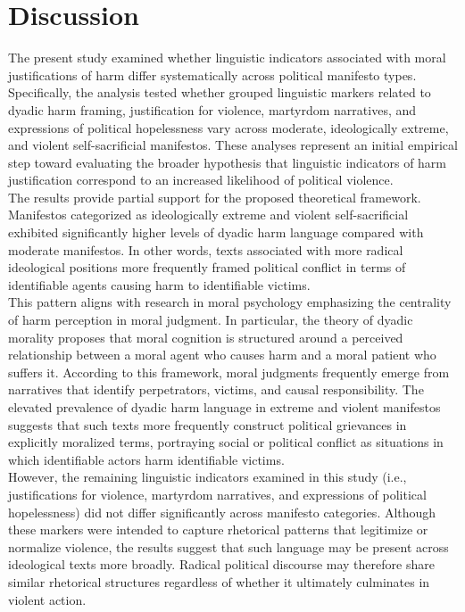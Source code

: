 \documentclass[
  english,
  man,floatsintext]{apa6}
\begin{document}
\section{Discussion}\label{discussion}

The present study examined whether linguistic indicators associated with moral justifications of harm differ systematically across political manifesto types. Specifically, the analysis tested whether grouped linguistic markers related to dyadic harm framing, justification for violence, martyrdom narratives, and expressions of political hopelessness vary across moderate, ideologically extreme, and violent self-sacrificial manifestos. These analyses represent an initial empirical step toward evaluating the broader hypothesis that linguistic indicators of harm justification correspond to an increased likelihood of political violence.\\
The results provide partial support for the proposed theoretical framework. Manifestos categorized as ideologically extreme and violent self-sacrificial exhibited significantly higher levels of dyadic harm language compared with moderate manifestos. In other words, texts associated with more radical ideological positions more frequently framed political conflict in terms of identifiable agents causing harm to identifiable victims.\\
This pattern aligns with research in moral psychology emphasizing the centrality of harm perception in moral judgment. In particular, the theory of dyadic morality proposes that moral cognition is structured around a perceived relationship between a moral agent who causes harm and a moral patient who suffers it. According to this framework, moral judgments frequently emerge from narratives that identify perpetrators, victims, and causal responsibility. The elevated prevalence of dyadic harm language in extreme and violent manifestos suggests that such texts more frequently construct political grievances in explicitly moralized terms, portraying social or political conflict as situations in which identifiable actors harm identifiable victims.\\
However, the remaining linguistic indicators examined in this study (i.e., justifications for violence, martyrdom narratives, and expressions of political hopelessness) did not differ significantly across manifesto categories. Although these markers were intended to capture rhetorical patterns that legitimize or normalize violence, the results suggest that such language may be present across ideological texts more broadly. Radical political discourse may therefore share similar rhetorical structures regardless of whether it ultimately culminates in violent action.\\
\end{document}
